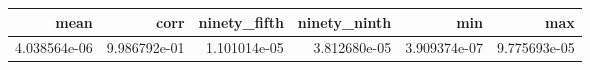 \begin{tabular}{rrrrrr}
\toprule
mean & corr & ninety_fifth & ninety_ninth & min & max \\
\midrule
4.038564e-06 & 9.986792e-01 & 1.101014e-05 & 3.812680e-05 & 3.909374e-07 & 9.775693e-05 \\
\bottomrule
\end{tabular}
